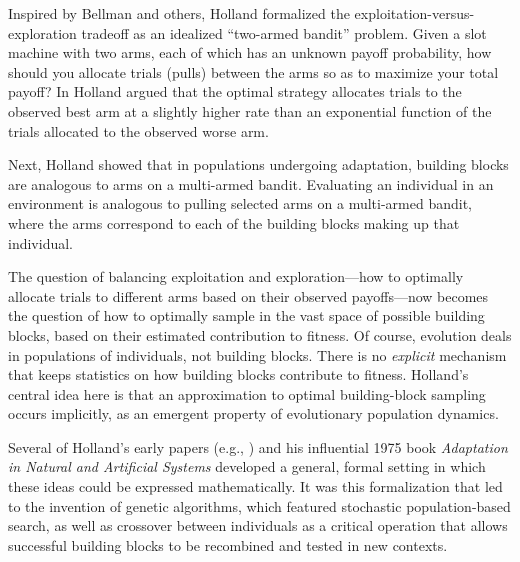 \documentclass{sig-alternate}
\begin{document}
Inspired by Bellman \cite{Bellman1961} and
others, Holland formalized the exploitation-versus-exploration tradeoff
as an idealized ``two-armed bandit'' problem. Given a slot machine
with two arms, each of which has an unknown payoff probability, how
should you allocate trials (pulls) between the arms so as to
maximize your total payoff?   In \cite{Holland1973,Holland1975}
Holland argued that the optimal strategy
allocates trials to the observed best arm at a slightly higher rate than
an exponential function of the trials allocated to the observed worse arm.  

Next, Holland showed that in populations undergoing adaptation,
building blocks are analogous to arms on a multi-armed bandit.  
Evaluating an individual in an environment is analogous to pulling selected
arms on a multi-armed bandit, where the arms correspond to each of the
building blocks making up that individual.

The question of balancing exploitation and exploration---how to
optimally allocate trials to different arms based on their observed 
payoffs---now becomes the question of how to optimally sample in the
vast space of possible building blocks, based on their estimated
contribution to fitness.  Of course, evolution deals in populations of
individuals, not building blocks.  There is no \emph{explicit} mechanism that
keeps statistics on how building blocks contribute to fitness. 
Holland's central idea here is that an approximation to
optimal building-block sampling occurs implicitly, as an emergent
property of evolutionary population dynamics.

Several of Holland's early papers (e.g.,
\cite{Holland1962,Holland1973}) and his influential 1975 book
\emph{Adaptation in Natural and Artificial Systems} \cite{Holland1975}
developed a general, formal setting in which these ideas could be
expressed mathematically.  It was this formalization that led to the
invention of genetic algorithms, which featured stochastic
population-based search, as well as crossover between individuals as a
critical operation that allows successful building blocks to be
recombined and tested in new contexts.  

\end{document}
